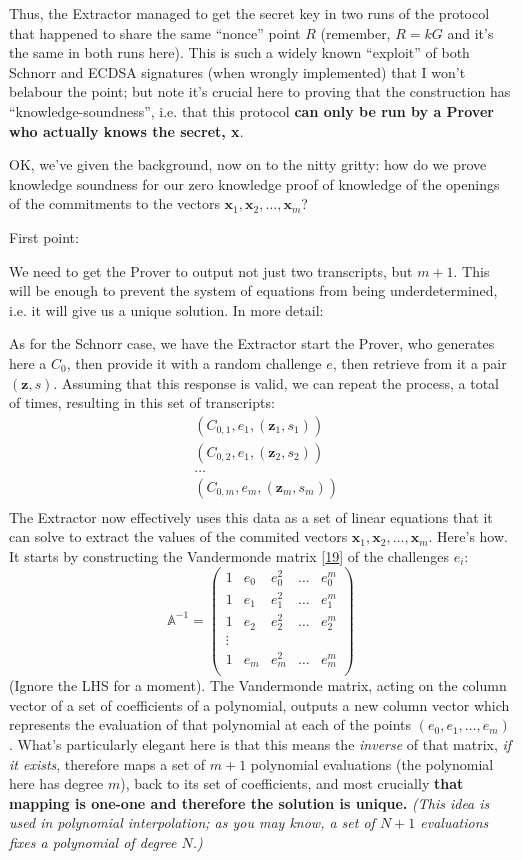 \documentclass[10pt,a4paper]{article}
\begin{document}
Thus, the Extractor managed to get the secret key in two runs of the
protocol that happened to share the same ``nonce'' point $R$ (remember, $R=kG$ and
it's the same in both runs here). This is such a widely known
``exploit'' of both Schnorr and ECDSA signatures (when wrongly
implemented) that I won't belabour the point; but note it's crucial here
to proving that the construction has ``knowledge-soundness'', i.e. that
this protocol \textbf{can only be run by a Prover who actually knows the
secret, x}.

OK, we've given the background, now on to the nitty gritty: how do we
prove knowledge soundness for our zero knowledge proof of knowledge of
the openings of the commitments to the vectors $\mathbf{x}_1, \mathbf{x}_2, \ldots, \mathbf{x}_m$?

First point:

We need to get the Prover to output not just two transcripts, but $m+1$. This
will be enough to prevent the system of equations from being
underdetermined, i.e. it will give us a unique solution. In more detail:

As for the Schnorr case, we have the Extractor start the Prover, who
generates here a $C_0$, then provide it with a random challenge $e$, then
retrieve from it a pair $(\mathbf{z}, s)$. Assuming that this response is
valid, we can repeat the process, a total of times, resulting in this
set of transcripts:
\begin{align*}
&(C_{0,1}, e_1, (\mathbf{z}_1 , s_1)) \\
&(C_{0,2}, e_1, (\mathbf{z}_2 , s_2)) \\
&\ldots \\
&(C_{0,m}, e_m, (\mathbf{z}_m , s_m)) \\
\end{align*}
The Extractor now effectively uses this data as a set of linear
equations that it can solve to extract the values of the commited
vectors $\mathbf{x}_1, \mathbf{x}_2, \ldots, \mathbf{x}_m$. Here's how. It starts by constructing the Vandermonde matrix
{[}\protect\hyperlink{anchor-30}{19}{]} of the challenges $e_i$:
\[
\mathbb{A}^{-1} = \begin{pmatrix}
1 & e_0 & e_0^2 & \dots & e_0^m \\
1 & e_1 & e_1^2 & \dots & e_1^m \\
1 & e_2 & e_2^2 & \dots & e_2^m \\
\vdots  \\
1 & e_m & e_m^2 & \dots & e_m^m \\
\end{pmatrix}
\]
(Ignore the LHS for a moment). The Vandermonde matrix, acting on the
column vector of a set of coefficients of a polynomial, outputs a new
column vector which represents the evaluation of that polynomial at each
of the points $(e_0, e_1, \ldots , e_m)$. What's particularly elegant here is that this means the
\emph{inverse} of that matrix, \emph{if it exists}, therefore maps a set
of $m+1$ polynomial evaluations (the polynomial here has degree $m$), back to its
set of coefficients, and most crucially \textbf{that mapping is one-one
and therefore the solution is unique. }\emph{(This idea is used in
polynomial interpolation; as you may know, a set of $N+1$ evaluations
fixes a polynomial of degree $N$.)}
\end{document}
